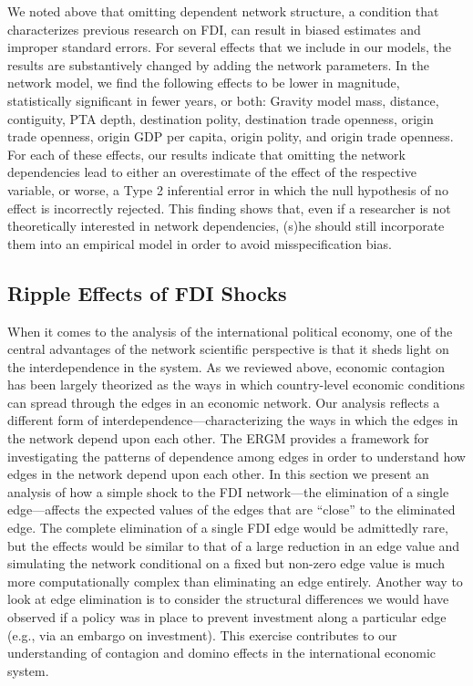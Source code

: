 \documentclass[reqno,onecolumn,letterpaper,12pt]{article}
\begin{document}
We noted above that omitting dependent network structure, a condition that characterizes previous research on FDI, can result in biased estimates and improper standard errors. For several effects that we include in our models, the results are substantively changed by adding the network parameters. In the network model, we find the following effects to be lower in magnitude, statistically significant in fewer years, or both: Gravity model mass, distance, contiguity, PTA depth, destination polity, destination trade openness, origin trade openness, origin GDP per capita, origin polity, and origin trade openness. For each of these effects, our results indicate that omitting the network dependencies lead to either an overestimate of the effect of the respective variable, or worse, a Type 2 inferential error in which the null hypothesis of no effect is incorrectly rejected. This finding shows that, even if a researcher is not theoretically interested in network dependencies, (s)he should still incorporate them into an empirical model in order to avoid misspecification bias.

\subsection{Ripple Effects of FDI Shocks}\label{contagion}

When it comes to the analysis of the international political economy, one of the central advantages of the network scientific perspective is that it sheds light on the interdependence in the system. As we reviewed above, economic contagion has been largely theorized as the ways in which country-level economic conditions can spread through the edges in an economic network. Our analysis reflects a different form of interdependence---characterizing the ways in which the edges in the network depend upon each other. The ERGM provides a framework for investigating the patterns of dependence among edges in order to understand how edges in the network depend upon each other. In this section we present an analysis of how a simple shock to the FDI network---the elimination of a single edge---affects the expected values of the edges that are ``close'' to the eliminated edge. The complete elimination of a single FDI edge would be admittedly rare, but the effects would be similar to that of a large reduction in an edge value and simulating the network conditional on a fixed but non-zero edge value is much more computationally complex than eliminating an edge entirely. Another way to look at edge elimination is to consider the structural differences we would have observed if a policy was in place to prevent investment along a particular edge (e.g., via an embargo on investment). This exercise contributes to our understanding of contagion and domino effects in the international economic system.
\end{document}
